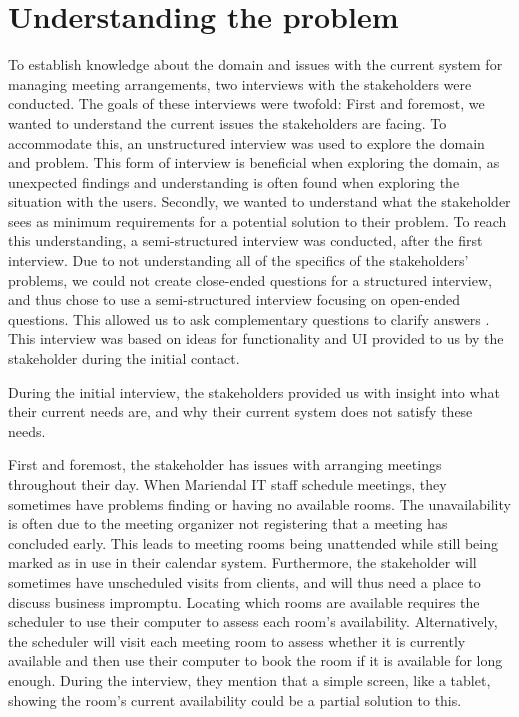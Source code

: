 \section{Understanding the problem}\label{sec:understanding_the_problem} %
To establish knowledge about the domain and issues with the current system for managing meeting arrangements, two interviews with the stakeholders were conducted. 
The goals of these interviews were twofold: 
First and foremost, we wanted to understand the current issues the stakeholders are facing. 
To accommodate this, an unstructured interview was used to explore the domain and problem\cite{benyon2013designing}. 
This form of interview is beneficial when exploring the domain, as unexpected findings and understanding is often found when exploring the situation with the users\cite{benyon2013designing}.
Secondly, we wanted to understand what the stakeholder sees as minimum requirements for a potential solution to their problem. 
To reach this understanding, a semi-structured interview was conducted, after the first interview.
Due to not understanding all of the specifics of the stakeholders' problems, we could not create close-ended questions for a structured interview, and thus chose to use a semi-structured interview focusing on open-ended questions. This allowed us to ask complementary questions to clarify answers \cite{InterviewsNHS}.
This interview was based on ideas for functionality and UI provided to us by the stakeholder during the initial contact.


During the initial interview, the stakeholders provided us with insight into what their current needs are, and why their current system does not satisfy these needs.

First and foremost, the stakeholder has issues with arranging meetings throughout their day.
When Mariendal IT staff schedule meetings, they sometimes have problems finding or having no available rooms.
The unavailability is often due to the meeting organizer not registering that a meeting has concluded early.
This leads to meeting rooms being unattended while still being marked as in use in their calendar system.
Furthermore, the stakeholder will sometimes have unscheduled visits from clients, and will thus need a place to discuss business impromptu. 
Locating which rooms are available requires the scheduler to use their computer to assess each room's availability.
Alternatively, the scheduler will visit each meeting room to assess whether it is currently available and then use their computer to book the room if it is available for long enough.
During the interview, they mention that a simple screen, like a tablet, showing the room's current availability could be a partial solution to this.

